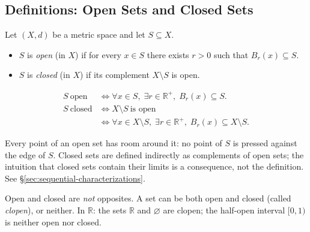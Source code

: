 \subsection{Definitions: Open Sets and Closed Sets}
\label{sec:open-closed-definitions}

\begin{tcolorbox}[colback=propbox, colframe=propborder, arc=2pt,
  left=6pt, right=6pt, top=4pt, bottom=4pt,
  title={\small\textbf{Definition (Open Set, Closed Set)}},
  fonttitle=\small\bfseries]
\begin{definition}
\label{def:open-closed-set}
Let $(X,d)$ be a metric space and let $S \subseteq X$.
\begin{itemize}
  \item $S$ is \emph{open} (in $X$) if for every $x \in S$ there exists
        $r > 0$ such that $B_r(x) \subseteq S$.
  \item $S$ is \emph{closed} (in $X$) if its complement $X \setminus S$
        is open.
\end{itemize}
\end{definition}
\end{tcolorbox}

\begin{remark*}
\begin{align*}
S\ \text{open}
  &\iff \forall x \in S,\;
         \exists r \in \mathbb{R}^{+},\;
         B_r(x) \subseteq S. \\[4pt]
S\ \text{closed}
  &\iff X \setminus S\ \text{is open} \\
  &\iff \forall x \in X \setminus S,\;
         \exists r \in \mathbb{R}^{+},\;
         B_r(x) \subseteq X \setminus S.
\end{align*}
\end{remark*}

\begin{remark*}[Intuition]
Every point of an open set has room around it: no point of $S$ is
pressed against the edge of $S$.
Closed sets are defined indirectly as complements of open sets; the
intuition that closed sets contain their limits is a consequence,
not the definition.
See \hyperref[sec:sequential-characterizations]{\S\ref*{sec:sequential-characterizations}}.
\end{remark*}

\begin{remark*}
Open and closed are \emph{not} opposites.
A set can be both open and closed (called \emph{clopen}), or neither.
In $\mathbb{R}$: the sets $\mathbb{R}$ and $\varnothing$ are clopen;
the half-open interval $[0,1)$ is neither open nor closed.
\end{remark*}


